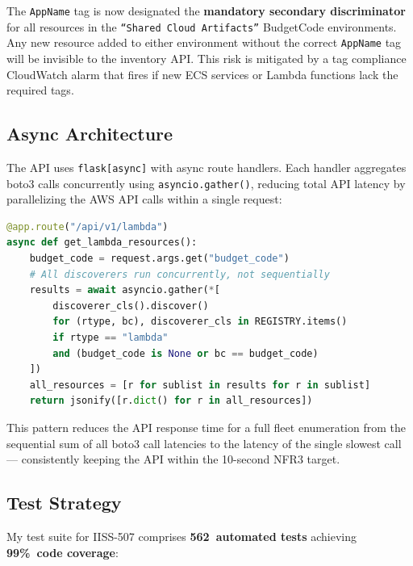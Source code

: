 The \texttt{AppName} tag is now designated the \textbf{mandatory secondary
discriminator} for all resources in the \texttt{``Shared Cloud Artifacts''}
BudgetCode environments. Any new resource added to either environment
without the correct \texttt{AppName} tag will be invisible to the
inventory API. This risk is mitigated by a tag compliance CloudWatch
alarm that fires if new ECS services or Lambda functions lack the
required tags.

\subsection{Async Architecture}

The API uses \texttt{flask[async]} with async route handlers.
Each handler aggregates boto3 calls concurrently using
\texttt{asyncio.gather()}, reducing total API latency by parallelizing
the AWS API calls within a single request:

\begin{lstlisting}[language=Python,
  caption={Async Route Handler --- Concurrent Discovery}]
@app.route("/api/v1/lambda")
async def get_lambda_resources():
    budget_code = request.args.get("budget_code")
    # All discoverers run concurrently, not sequentially
    results = await asyncio.gather(*[
        discoverer_cls().discover()
        for (rtype, bc), discoverer_cls in REGISTRY.items()
        if rtype == "lambda"
        and (budget_code is None or bc == budget_code)
    ])
    all_resources = [r for sublist in results for r in sublist]
    return jsonify([r.dict() for r in all_resources])
\end{lstlisting}

This pattern reduces the API response time for a full fleet enumeration
from the sequential sum of all boto3 call latencies to the latency of
the single slowest call --- consistently keeping the API within the
10-second NFR3 target.

\subsection{Test Strategy}

My test suite for IISS-507 comprises \textbf{562~automated tests}
achieving \textbf{99\%~code coverage}:

